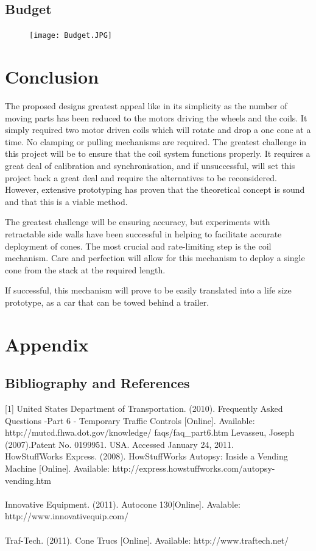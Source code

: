 \documentclass[11pt]{report}
\begin{document}
\section{Budget}
\begin{figure}[h!]
  \begin{center}
    \texttt{[image: Budget.JPG]}
  \end{center}
  
\end{figure}
\chapter{Conclusion}
The proposed designs greatest appeal like in its simplicity as the number of moving parts has been reduced to the motors driving the wheels and the coils. It simply required two motor driven coils which will rotate and drop a one cone at a time. No clamping or pulling mechanisms are required. The greatest challenge in this project will be to ensure that the coil system functions properly. It requires a great deal of calibration and synchronisation, and if unsuccessful, will set this project back a great deal and require the alternatives to be reconsidered. However, extensive prototyping has proven that the theoretical concept is sound and that this is a viable method.

The greatest challenge will be ensuring accuracy, but experiments with retractable side walls have been successful in helping to facilitate accurate deployment of cones. The most crucial and rate-limiting step is the coil mechanism. Care and perfection will allow for this mechanism to deploy a single cone from the stack at the required length.

If successful, this mechanism will prove to be easily translated into a life size prototype, as a car that can be towed behind a trailer.

\appendix
\chapter{Appendix}
\section{Bibliography and References}

[1] United States Department of Transportation. (2010). Frequently Asked Questions -Part 6 - Temporary Traffic Controls [Online]. Available: http://mutcd.fhwa.dot.gov/knowledge/ faqs/faq\_part6.htm
\newline\newline
Levasseu, Joseph (2007).Patent No. 0199951. USA. Accessed January 24, 2011.
\newline\\
HowStuffWorks Express. (2008). HowStuffWorks Autopsy: Inside a Vending Machine [Online]. Available: http://express.howstuffworks.com/autopsy-vending.htm
\\\\
Innovative Equipment. (2011). Autocone 130[Online]. Avalable: http://www.innovativequip.com/
\\\\
Traf-Tech. (2011). Cone Trucs [Online]. Available: http://www.traftech.net/
\end{document}
